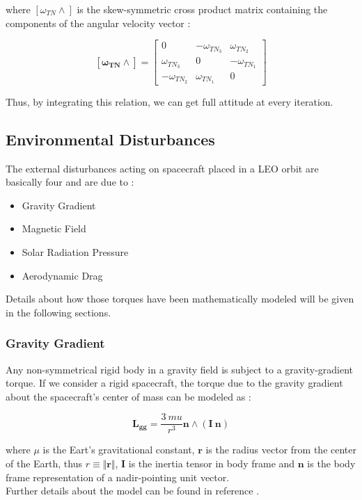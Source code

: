 where $[\omega_{TN} \wedge]$ is the skew-symmetric cross product matrix containing the components of the angular velocity vector :

\begin{equation*}
  \mathbf{[\omega_{TN} \wedge]} =
  \begin{bmatrix}
    0                & -\omega_{TN_{3}} & \omega_{TN_{2}}  \\
    \omega_{TN_{3}}  & 0                & -\omega_{TN_{1}} \\
    -\omega_{TN_{2}} & \omega_{TN_{1}}  & 0
  \end{bmatrix}
\end{equation*}

Thus, by integrating this relation, we can get full attitude at every iteration.

\subsection{Environmental Disturbances} \label{sec:disturbances}
The external disturbances acting on spacecraft placed in a LEO orbit are basically four and are due to :

\begin{itemize}
  \item Gravity Gradient
  \item Magnetic Field
  \item Solar Radiation Pressure
  \item Aerodynamic Drag
\end{itemize}

Details about how those torques have been mathematically modeled will be given in the following sections.

\subsubsection{Gravity Gradient}
Any non-symmetrical rigid body in a gravity field is subject to a gravity-gradient torque.
If we consider a rigid spacecraft, the torque due to the gravity gradient about the spacecraft's center of mass can be modeled as :

\begin{equation}
  \mathbf{L_{gg}} = \frac{3 \ mu}{r^3} \mathbf{n} \wedge (\mathbf{I} \ \mathbf{n})
\end{equation}

where $\mu$ is the Eart's gravitational constant, $\textbf{r}$ is the radius vector from the center of the Earth, thus $r \equiv \Vert{\textbf{r}}\Vert$, $\textbf{I}$ is the inertia tensor in body frame and $\textbf{n}$ is the body frame representation of a nadir-pointing unit vector.\\
Further details about the model can be found in reference \cite{Markley2014}.

